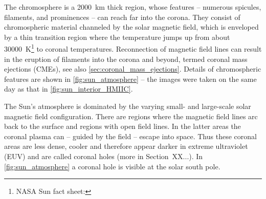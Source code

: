 The chromosphere is a \SI{2000}{\km} thick region, whose features -- numerous spicules, filaments, and prominences -- can reach far into the corona. They consist of chromospheric material channeled by the solar magnetic field, which is enveloped by a thin transition region where the temperature jumps up from about \SI{30000}{\K}\footnote{NASA Sun fact sheet: } to coronal temperatures. Reconnection of magnetic field lines can result in the eruption of filaments into the corona and beyond, termed coronal mass ejections (CMEs), see also \autoref{sec:coronal_mass_ejections}. Details of chromospheric features are shown in \autoref{fig:sun_atmosphere} -- the images were taken on the same day as that in \autoref{fig:sun_interior_HMIIC}.
\begin{figure}[htb]
\end{figure}

The Sun's atmosphere is dominated by the varying small- and large-scale solar magnetic field configuration. There are regions where the magnetic field lines arc back to the surface and regions with open field lines. In the latter areas the coronal plasma can -- guided by the field -- escape into space. Thus these coronal areas are less dense, cooler and therefore appear darker in extreme ultraviolet (EUV) and are called coronal holes (more in Section~XX...). In \autoref{fig:sun_atmosphere} a coronal hole is visible at the solar south pole.

